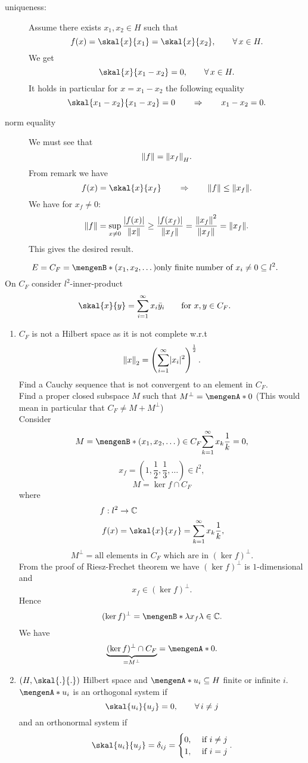 \begin{beweis}
\begin{description}
\[		\]
		\item[uniqueness:] Assume there exists $x_1,x_2 \in H$ such that 
		\[
			f(x) = \skal{x}{x_1} = \skal{x}{x_2}, \qquad \forall\, x \in H.
		\]
		We get
		\[
			\skal{x}{x_1-x_2} = 0, \qquad \forall\, x \in H.
		\]
		It holds in particular for $x = x_1 - x_2$ the following equality
		\[
			\skal{x_1-x_2}{x_1-x_2} = 0 \qquad \Rightarrow \qquad x_1-x_2 = 0.
		\]
		\item[norm equality] We must see that \[
			\norm{f} = \norm{x_f}_H.
		\] From remark we have 
		\[
			f(x) = \skal{x}{x_f} \qquad \Rightarrow  \qquad \norm{f} \leq \norm{x_f}.
		\]
		We have for $x_f \neq 0$:
		\[
			\norm{f} = \sup_{x \neq 0} \frac{\abs{f(x)}}{\norm{x}} \geq \frac{\abs{f(x_f)}}{\norm{x_f}} = \frac{\norm{x_f}^2}{\norm{x_f}} = \norm{x_f}.
		\]
		This gives the desired result.
	\end{description}
\end{beweis}
\begin{beispiel}
	\[
		E = C_F = \set[(x_1,x_2,\dots)]{\text{only finite number of $x_i \neq 0$}} \subseteq l^2.
	\]
	On $C_F$ consider $l^2$-inner-product
	\[
		\skal{x}{y} = \sum^{\infty}_{i=1} x_i \bar{y}_i \qquad \text{for }x,y \in C_F.
	\]
	\begin{enumerate}
		\item $C_F$ is not a Hilbert space as it is not complete w.r.t
		\[
			\norm{x}_2 = \left( \sum^{\infty}_{i=1} \abs{x_i}^2 \right)^{\frac{1}{2}}.
		\]
		Find a Cauchy sequence that is not convergent to an element in $C_F$. \\
		Find a proper closed subspace $M$ such that $M^{\perp}= \set{0}$ (This would mean in particular that $C_F \neq M + M^{\perp}$) \\
		Consider
		\[
			M = \set[(x_1,x_2,\dots) \in C_F]{\sum_{k=1}^{\infty} x_k \frac{1}{k}=0},
		\]
		\[
			x_f = (1, \frac{1}{2}, \frac{1}{3}, \dots) \in l^2,
		\]
		\[
			M = \ker{f} \cap C_F
		\]
		where
		\begin{align*}
			f: l^2 &\to \mathbb{C} \\
			f(x) &= \skal{x}{x_f} = \sum_{k=1}^{\infty}x_k \frac{1}{k},
		\end{align*}
		\[
			M^{\perp} = \text{all elements in $C_F$ which are in $(\ker{f})^{\perp}$}.
		\]
		From the proof of Riesz-Frechet theorem  we have $(\ker{f})^{\perp}$ is $1$-dimensional and \[
			x_f \in (\ker{f})^{\perp}.
		\]
		Hence
		\[
			(\ker{f})^{\perp} = \set[\lambda x_f]{\lambda \in \mathbb{C}}.
		\]
		We have
		\[
			\underset{= M ^{\perp}}{\underbrace{(\ker{f})^{\perp} \cap C_F}} = \set{0}.
		\]
		\item $(H,\skal{.}{.})$ Hilbert space and $\set{u_i} \subseteq H$ finite or infinite $i$. $\set{u_i}$ is an orthogonal system if
		\[
			\skal{u_i}{u_j}=0, \qquad \forall\, i \neq j
		\]
		and an orthonormal system if
		\[
			\skal{u_i}{u_j} = \delta_{ij} = \begin{cases}
				0, &\text{ if }i \neq j\\
				1, &\text{ if }i = j
			\end{cases}.
		\]
		\end{enumerate}
	\end{beispiel}

